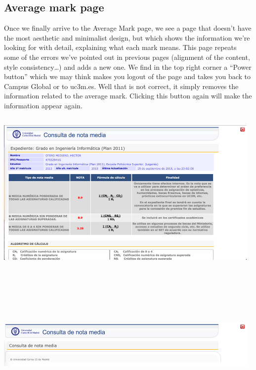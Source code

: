 \documentclass{article}
\begin{document}
\subsection{Average mark page}
Once we finally arrive to the Average Mark page, we see a page that doesn’t have the most aesthetic and minimalist design, but which shows the information we’re looking for with detail, explaining what each mark means. This page repeats some of the errors we’ve pointed out in previous pages (alignment of the content, style consistency…) and adds a new one. We find in the top right corner a “Power button” which we may think makes you logout of the page and takes you back to Campus Global or to uc3m.es. Well that is not correct, it simply removes the information related to the average mark. Clicking this button again will make the information appear again. \vspace{0.2cm} \\
\begin{center}
\includegraphics[width=13cm, height=8cm, keepaspectratio]{notamedia}\vspace{0.3cm} \\
\includegraphics[width=13cm, height=8cm, keepaspectratio]{power}\vspace{0.3cm} \\
\end{center}
\end{document}
